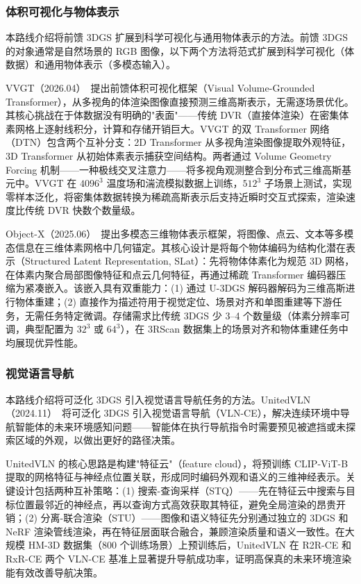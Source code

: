\subsubsection{体积可视化与物体表示}

本路线介绍将前馈 3DGS 扩展到科学可视化与通用物体表示的方法。前馈 3DGS 的对象通常是自然场景的 RGB 图像，以下两个方法将范式扩展到科学可视化（体数据）和通用物体表示（多模态输入）。

VVGT（2026.04）~\cite{2604_12217}提出前馈体积可视化框架（Visual Volume-Grounded Transformer），从多视角的体渲染图像直接预测三维高斯表示，无需逐场景优化。其核心挑战在于体数据没有明确的"表面"——传统 DVR（直接体渲染）在密集体素网格上逐射线积分，计算和存储开销巨大。VVGT 的双 Transformer 网络（DTN）包含两个互补分支：2D Transformer 从多视角渲染图像提取外观特征，3D Transformer 从初始体素表示捕获空间结构。两者通过 Volume Geometry Forcing 机制——一种极线交叉注意力——将多视角观测整合到分布式三维高斯基元中。VVGT 在 $4096^3$ 温度场和湍流模拟数据上训练，$512^3$ 子场景上测试，实现零样本泛化，将密集体数据转换为稀疏高斯表示后支持近瞬时交互式探索，渲染速度比传统 DVR 快数个数量级。

Object-X（2025.06）~\cite{2506_04789}提出多模态三维物体表示框架，将图像、点云、文本等多模态信息在三维体素网格中几何锚定。其核心设计是将每个物体编码为结构化潜在表示（Structured Latent Representation, SLat）：先将物体体素化为规范 3D 网格，在体素内聚合局部图像特征和点云几何特征，再通过稀疏 Transformer 编码器压缩为紧凑嵌入。该嵌入具有双重能力：(1) 通过 U-3DGS 解码器解码为三维高斯进行物体重建；(2) 直接作为描述符用于视觉定位、场景对齐和单图重建等下游任务，无需任务特定微调。存储需求比传统 3DGS 少 3--4 个数量级（体素分辨率可调，典型配置为 $32^3$ 或 $64^3$），在 3RScan 数据集上的场景对齐和物体重建任务中均展现优异性能。

\subsubsection{视觉语言导航}

本路线介绍将可泛化 3DGS 引入视觉语言导航任务的方法。UnitedVLN（2024.11）~\cite{2411_16053}将可泛化 3DGS 引入视觉语言导航（VLN-CE），解决连续环境中导航智能体的未来环境感知问题——智能体在执行导航指令时需要预见被遮挡或未探索区域的外观，以做出更好的路径决策。

UnitedVLN 的核心思路是构建"特征云"（feature cloud），将预训练 CLIP-ViT-B 提取的网格特征与神经点位置关联，形成同时编码外观和语义的三维神经表示。关键设计包括两种互补策略：(1) 搜索-查询采样（STQ）——先在特征云中搜索与目标位置最邻近的神经点，再以查询方式高效获取其特征，避免全局渲染的昂贵开销；(2) 分离-联合渲染（STU）——图像和语义特征先分别通过独立的 3DGS 和 NeRF 渲染管线渲染，再在特征层面联合融合，兼顾渲染质量和语义一致性。在大规模 HM-3D 数据集（800 个训练场景）上预训练后，UnitedVLN 在 R2R-CE 和 RxR-CE 两个 VLN-CE 基准上显著提升导航成功率，证明高保真的未来环境渲染能有效改善导航决策。

